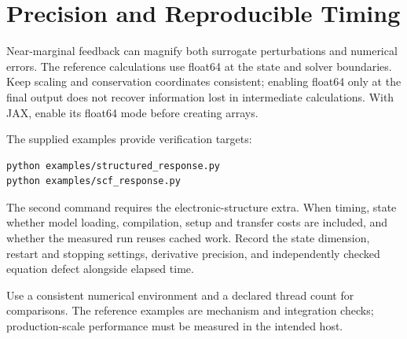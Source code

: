 \section{Precision and Reproducible Timing}
Near-marginal feedback can magnify both surrogate perturbations and
numerical errors. The reference calculations use float64 at the state and
solver boundaries. Keep scaling and conservation coordinates consistent;
enabling float64 only at the final output does not recover information
lost in intermediate calculations. With JAX, enable its float64 mode
before creating arrays.

The supplied examples provide verification targets:
\begin{lstlisting}[language=bash]
python examples/structured_response.py
python examples/scf_response.py
\end{lstlisting}
The second command requires the electronic-structure extra. When timing,
state whether model loading, compilation, setup and transfer costs are
included, and whether the measured run reuses cached work. Record the
state dimension, restart and stopping settings, derivative precision,
and independently checked equation defect alongside elapsed time.

Use a consistent numerical environment and a declared thread count for
comparisons. The reference examples are mechanism and integration checks;
production-scale performance must be measured in the intended host.
